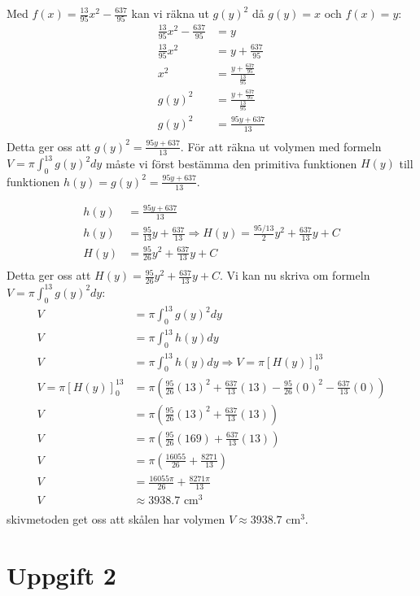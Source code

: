 \documentclass[12pt]{article}
\begin{document}
\newpage
Med $f(x)=\frac{13}{95}x^2-\frac{637}{95}$ kan vi räkna ut $g{(y)}^2$ då $g(y)=x$ och $f(x)=y$:
\begin{align*}
    \frac{13}{95}x^2-\frac{637}{95}&=y\\
    \frac{13}{95}x^2&=y+\frac{637}{95}\\
    x^2&=\frac{y+\frac{637}{95}}{\frac{13}{95}}\\
    g{(y)}^2&=\frac{y+\frac{637}{95}}{\frac{13}{95}}\\
    g{(y)}^2&=\frac{95y+637}{13}\\
\end{align*}
Detta ger oss att $g{(y)}^2=\frac{95y+637}{13}$.
För att räkna ut volymen med formeln $V=\pi\int_{0}^{13}{g(y)}^2dy$ måste vi först bestämma den primitiva funktionen $H(y)$ till funktionen $h(y)=g{(y)}^2=\frac{95y+637}{13}$.

\begin{align*}
    h(y)&=\frac{95y+637}{13}\\
    h(y)&=\frac{95}{13}y+\frac{637}{13} \Rightarrow H(y)=\frac{95/13}{2}y^2+\frac{637}{13}y+C\\
    H(y)&=\frac{95}{26}y^2+\frac{637}{13}y+C\\
\end{align*}
Detta ger oss att $H(y)=\frac{95}{26}y^2+\frac{637}{13}y+C$.
\newpage
Vi kan nu skriva om formeln $V=\pi\int_{0}^{13}{g(y)}^2dy$:
\begin{align*}
    V&=\pi\int_{0}^{13}{g(y)}^2dy\\
    V&=\pi\int_{0}^{13}{h(y)}dy\\
    V&=\pi\int_{0}^{13}{h(y)}dy\Rightarrow V=\pi{\left[{H(y)}\right]}_{0}^{13}\\
    V=\pi{\left[{H(y)}\right]}_{0}^{13}&=\pi\left(\frac{95}{26}{(13)}^2+\frac{637}{13}(13)-\frac{95}{26}{(0)}^2-\frac{637}{13}(0)\right)\\
    V&=\pi\left(\frac{95}{26}{(13)}^2+\frac{637}{13}(13)\right)\\
    V&=\pi\left(\frac{95}{26}{(169)}+\frac{637}{13}(13)\right)\\
    V&=\pi\left(\frac{16055}{26}+\frac{8271}{13}\right)\\
    V&=\frac{16055\pi}{26}+\frac{8271\pi}{13}\\
    V&\approx 3938.7\text{ cm}^3\\
\end{align*}
skivmetoden get oss att skålen har volymen $V\approx 3938.7\text{ cm}^3$.
\newpage
\section{Uppgift 2}
\end{document}
